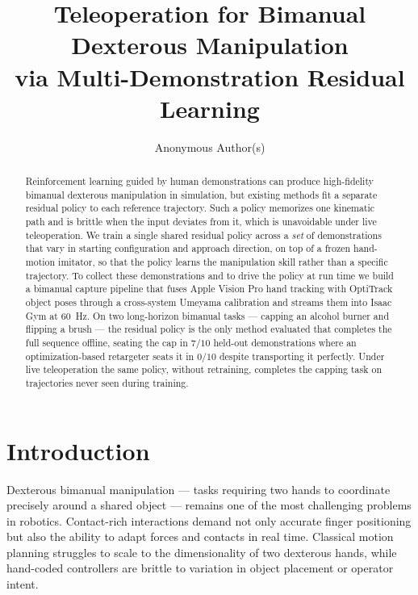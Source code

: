 \documentclass[letterpaper, 10 pt, conference]{ieeeconf}
\title{\LARGE \bf
Teleoperation for Bimanual Dexterous Manipulation \\ via Multi-Demonstration Residual Learning}
\author{Anonymous Author(s)}
\begin{document}
\maketitle
\thispagestyle{empty}
\pagestyle{empty}

\begin{abstract}

Reinforcement learning guided by human demonstrations can produce high-fidelity
bimanual dexterous manipulation in simulation, but existing methods fit a separate
residual policy to each reference trajectory. Such a policy memorizes one kinematic
path and is brittle when the input deviates from it, which is unavoidable under live
teleoperation. We train a single shared residual policy across a \emph{set} of
demonstrations that vary in starting configuration and approach direction, on top of a
frozen hand-motion imitator, so that the policy learns the manipulation skill rather
than a specific trajectory. To collect these demonstrations and to drive the
policy at run time we build a bimanual capture pipeline that fuses Apple Vision Pro
hand tracking with OptiTrack object poses through a cross-system Umeyama calibration
and streams them into Isaac Gym at \SI{60}{\hertz}. On two long-horizon bimanual tasks
--- capping an alcohol burner and flipping a brush --- the residual policy is the only
method evaluated that completes the full sequence offline, seating the cap in $7/10$
held-out demonstrations where an optimization-based retargeter seats it in $0/10$
despite transporting it perfectly. Under live teleoperation the same policy, without
retraining, completes the capping task on trajectories never seen during training.

\end{abstract}

\section{Introduction}

Dexterous bimanual manipulation --- tasks requiring two hands to coordinate precisely
around a shared object --- remains one of the most challenging problems in robotics.
Contact-rich interactions demand not only accurate finger positioning but also the
ability to adapt forces and contacts in real time. Classical motion planning struggles
to scale to the dimensionality of two dexterous hands, while hand-coded controllers are
brittle to variation in object placement or operator intent.
\end{document}
